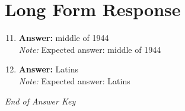 \documentclass[12pt]{article}
\begin{document}
\section*{Long Form Response}
\begin{enumerate}[label=\arabic*.]
\setcounter{enumi}{10}
\item \textbf{Answer:} middle of 1944
\\ \textit{Note:} Expected answer: middle of 1944
\item \textbf{Answer:} Latins
\\ \textit{Note:} Expected answer: Latins
\end{enumerate}

\vfill
\noindent\textit{End of Answer Key}
\end{document}

